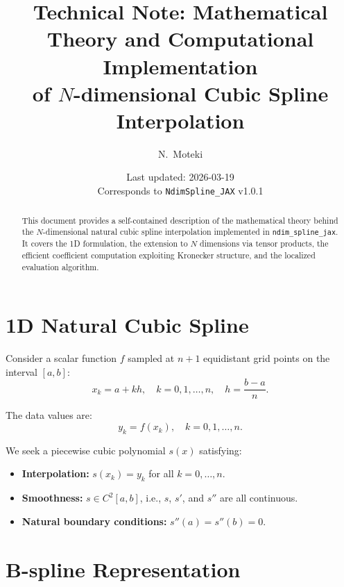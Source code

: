 \documentclass[11pt,a4paper]{article}
\title{Technical Note: Mathematical Theory and Computational Implementation\\
of $N$-dimensional Cubic Spline Interpolation}
\author{N.\ Moteki}
\date{Last updated: 2026-03-19\\Corresponds to \texttt{NdimSpline\_JAX} v1.0.1}
\begin{document}
\maketitle

\begin{abstract}
\noindent
This document provides a self-contained description of the mathematical theory
behind the $N$-dimensional natural cubic spline interpolation implemented in
\texttt{ndim\_spline\_jax}. It covers the 1D formulation, the extension to
$N$ dimensions via tensor products, the efficient coefficient computation
exploiting Kronecker structure, and the localized evaluation algorithm.
\end{abstract}

\tableofcontents

\section{1D Natural Cubic Spline}

Consider a scalar function $f$ sampled at $n + 1$ equidistant grid points
on the interval $[a, b]$:
\begin{equation}\label{eq:grid}
  x_k = a + k h, \quad k = 0, 1, \ldots, n, \quad h = \frac{b - a}{n}.
\end{equation}

The data values are:
\begin{equation}\label{eq:data}
  y_k = f(x_k), \quad k = 0, 1, \ldots, n.
\end{equation}

We seek a piecewise cubic polynomial $s(x)$ satisfying:
\begin{itemize}[nosep]
  \item \textbf{Interpolation:} $s(x_k) = y_k$ for all $k = 0, \ldots, n$.
  \item \textbf{Smoothness:} $s \in C^2[a, b]$, i.e., $s$, $s'$, and $s''$ are all continuous.
  \item \textbf{Natural boundary conditions:} $s''(a) = s''(b) = 0$.
\end{itemize}

\section{B-spline Representation}
\end{document}
